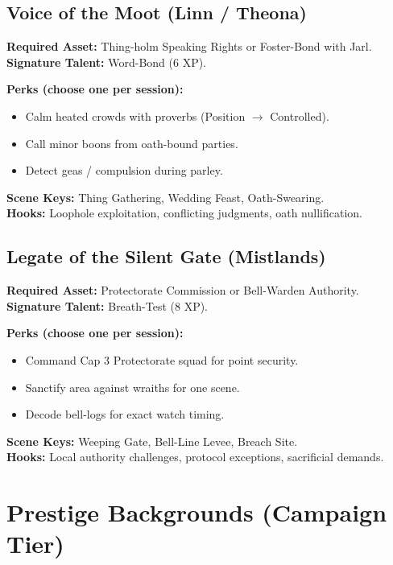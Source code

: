 \subsection{Voice of the Moot (Linn / Theona)}\label{subsec:voice_moot}

\textbf{Required Asset:} Thing-holm Speaking Rights or Foster-Bond with Jarl.\\
\textbf{Signature Talent:} Word-Bond (6 XP).

\textbf{Perks (choose one per session):}
\begin{itemize}
    \item Calm heated crowds with proverbs (Position $\rightarrow$ Controlled).
    \item Call minor boons from oath-bound parties.
    \item Detect geas / compulsion during parley.
\end{itemize}

\textbf{Scene Keys:} Thing Gathering, Wedding Feast, Oath-Swearing.\\
\textbf{Hooks:} Loophole exploitation, conflicting judgments, oath nullification.

\subsection{Legate of the Silent Gate (Mistlands)}\label{subsec:legate_gate}

\textbf{Required Asset:} Protectorate Commission or Bell-Warden Authority.\\
\textbf{Signature Talent:} Breath-Test (8 XP).

\textbf{Perks (choose one per session):}
\begin{itemize}
    \item Command Cap 3 Protectorate squad for point security.
    \item Sanctify area against wraiths for one scene.
    \item Decode bell-logs for exact watch timing.
\end{itemize}

\textbf{Scene Keys:} Weeping Gate, Bell-Line Levee, Breach Site.\\
\textbf{Hooks:} Local authority challenges, protocol exceptions, sacrificial demands.

\section{Prestige Backgrounds (Campaign Tier)}\label{sec:prestige_backgrounds}


